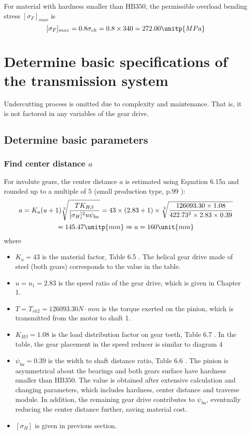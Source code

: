 For material with hardness smaller than $ \text{HB}350 $, the permissible overload bending stress $ [\sigma_F]_{max} $ is
\[ [\sigma_F]_{max} = 0.8\sigma_{ch} = 0.8\times 340 = 272.00\unitp{MPa} \]

\section{Determine basic specifications of the transmission system}
Undercutting process is omitted due to complexity and maintenance. That is, it is not factored in any variables of the gear drive.
\subsection{Determine basic parameters}
\subsubsection{Find center distance $ a $}
For involute gears, the center distance $ a $ is estimated using Equation 6.15a \cite{tk1} and rounded up to a multiple of 5 (small production type, p.99 \cite{tk1}):
\begin{multline*}
a= K_a(u+1)\sqrt[3]{\dfrac{TK_{H\beta}}{[\sigma_H]^2u\psi_{ba}}}	=  43\times(2.83+1)\times\sqrt[3]{\dfrac{126093.30\times 1.08}{422.73^2\times 2.83\times 0.39}}\\
= 145.47 \unitp{mm} \Rightarrow a= 160 \unit{mm}
\end{multline*}
where
\begin{itemize}
	\item $ K_a=43 $ is the material factor, Table 6.5 \cite{tk1}. The helical gear drive made of steel (both gears) corresponds to the value in the table.
	\item $ u =u_1 = 2.83$ is the speed ratio of the gear drive, which is given in Chapter 1.
	\item $ T=T_{sh2}= 126093.30\unit{N\cdot mm}$ is the torque exerted on the pinion, which is transmitted from the motor to shaft 1.
	\item $ K_{H\beta} = 1.08 $ is the load distribution factor on gear teeth, Table 6.7 \cite{tk1}. In the table, the gear placement in the speed reducer is similar to diagram 4
	\item $ \psi_{ba} = 0.39 $ is the width to shaft distance ratio, Table 6.6 \cite{tk1}. The pinion is asymmetrical about the bearings and both gears surface have hardness smaller than $ \text{HB}350 $. The value is obtained after extensive calculation and changing parameters, which includes hardness, center distance and traverse module. In addition, the remaining gear drive contributes to $ \psi_{ba} $, eventually reducing the center distance further, saving material cost.
	\item $ [\sigma_H] $ is given in previous section.
\end{itemize}

